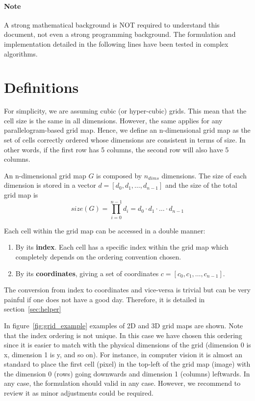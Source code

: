 \documentclass[12pt]{article}
\begin{document}
\paragraph{Note}
A strong mathematical background is NOT required to understand this document, not even a strong programming background. The formulation
and implementation detailed in the following lines have been tested in complex algorithms.

\section{Definitions}
For simplicity, we are assuming cubic (or hyper-cubic) grids. This mean that the cell size is the same in all dimensions. However, the
same applies for any parallelogram-based grid map. Hence, we define an n-dimensional grid map as the set of cells correctly ordered whose
dimensions are consistent in terms of size. In other words, if the first row has 5 columns, the second row will also have 5 columns.


An n-dimensional grid map $G$ is composed by $n_{dims}$ dimensions. The size of each dimension is stored in a vector 
$d = [d_0, d_1,\dots,d_{n-1}]$ and the size of the total grid map is 
$$size(G) = \prod_{i=0}^{n-1}d_i = d_0\cdot d_1\cdot\dots\cdot d_{n-1}$$

\noindent Each cell within the grid map can be accessed in a double manner:
\begin{enumerate}
 \item By its \textbf{index}. Each cell has a specific index within the grid map which completely depends on the ordering convention chosen.
 \item By its \textbf{coordinates}, giving a set of coordinates $c = [c_0, c_1,\dots,c_{n-1}]$.
\end{enumerate}
The conversion from index to coordinates and vice-versa is trivial but can be very painful if one does not have a good day. Therefore,
it is detailed in section~\ref{sec:helper}


In figure~\ref{fig:grid_example} examples of 2D and 3D grid maps are shown. Note that the index ordering is not unique. In this case we
have chosen this ordering since it is easier to match with the physical dimensions of the grid (dimension 0 is x, dimension 1 is y, and so on). 
For instance, in computer vision it is almost an standard to place the first cell (pixel) in the top-left of the grid map (image) with the
dimension 0 (rows) going downwards and dimension 1 (columns) leftwards. In any case, the formulation should valid in any case. However,
we recommend to review it as minor adjustments could be required.
\end{document}
